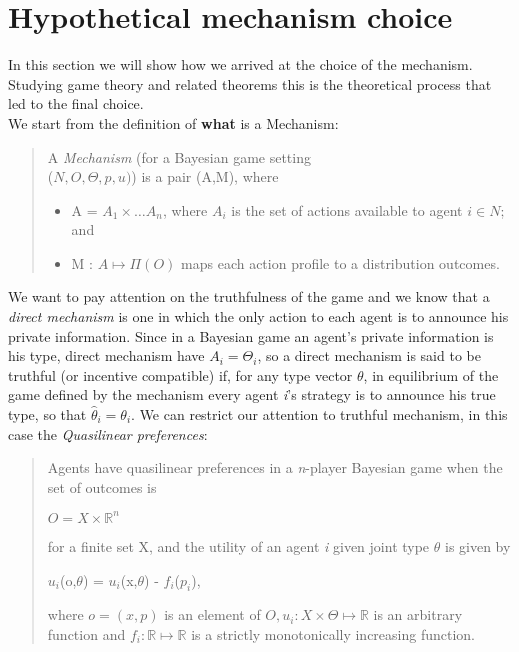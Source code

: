 \documentclass{article}
\begin{document}
\section{Hypothetical mechanism choice}
\Large{
In this section we will show how we arrived at the choice of the mechanism. Studying game theory and related theorems this is the theoretical process that led to the final choice.\\
We start from the definition of \textbf{what} is a Mechanism:
\begin{quote}
    A \textit{Mechanism} (for a Bayesian game setting\\ ($N,O,\Theta,p,u)$) is a pair (A,M), where
    \begin{itemize}
        \item A = $A_1 \times \dots A_n$, where $A_i$ is the set of actions available to agent $i \in N$; and
        \item M : $A \mapsto \Pi(O)$ maps each action profile to a distribution outcomes.
    \end{itemize}
\end{quote}
We want to pay attention on the truthfulness of the game and we know that a \textit{direct mechanism} is one in which the only action to each agent is to announce his private information. Since in a Bayesian game an agent's private information is his type, direct mechanism have $A_i = \Theta_i$, so a direct mechanism is said to be truthful (or incentive compatible) if, for any type vector $\theta$, in equilibrium of the game defined by the mechanism every agent \textit{i}'s strategy is to announce his true type, so that $\hat{\theta}_i = \theta_i$. We can restrict our attention to truthful mechanism, in this case the \textit{Quasilinear preferences}:
\begin{quote}
    Agents have quasilinear preferences in a \textit{n}-player Bayesian game when the set of outcomes is
    \begin{center}
        $O = X \times \mathbb{R}^n$
    \end{center}
    for a finite set X, and the utility of an agent \textit{i} given joint type $\theta$ is given by
    \begin{center}
        $u_i$(o,$\theta$) = $u_i$(x,$\theta$) - $f_i$($p_i$),
    \end{center}
    where $o = (x,p)$ is an element of $O, u_i : X \times \Theta \mapsto \mathbb{R}$ is an arbitrary function  and $f_i : \mathbb{R} \mapsto \mathbb{R}$ is a strictly monotonically increasing function.
\end{quote}
}
\end{document}

